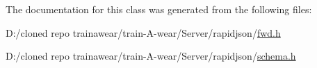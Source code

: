 The documentation for this class was generated from the following files\+:\begin{DoxyCompactItemize}
\item 
D\+:/cloned repo trainawear/train-\/\+A-\/wear/\+Server/rapidjson/\mbox{\hyperlink{fwd_8h}{fwd.\+h}}\item 
D\+:/cloned repo trainawear/train-\/\+A-\/wear/\+Server/rapidjson/\mbox{\hyperlink{schema_8h}{schema.\+h}}\end{DoxyCompactItemize}
